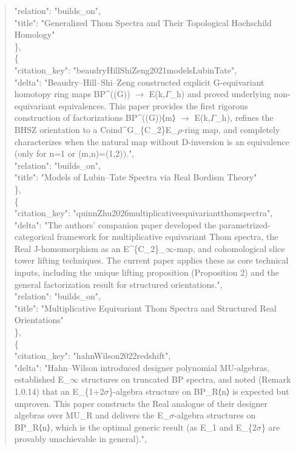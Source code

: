 \documentclass[11pt]{article}
\begin{document}
\begin{quote}
      "relation": "builds\_on",\\
      "title": "Generalized Thom Spectra and Their Topological Hochschild Homology"\\
    \},\\
    \{\\
      "citation\_key": "beaudryHillShiZeng2021modelsLubinTate",\\
      "delta": "Beaudry--Hill--Shi--Zeng constructed explicit G-equivariant homotopy ring maps BP\^{}((G)) \ensuremath{\to} E(k,\ensuremath{\Gamma}\_h) and proved underlying non-equivariant equivalences. This paper provides the first rigorous construction of factorizations BP\^{}((G))⟨m⟩ \ensuremath{\to} E(k,\ensuremath{\Gamma}\_h), refines the BHSZ orientation to a Coind\^{}G\_\{C\_2\}E\_\ensuremath{\rho}-ring map, and completely characterizes when the natural map without D-inversion is an equivalence (only for n=1 or (m,n)=(1,2)).",\\
      "relation": "builds\_on",\\
      "title": "Models of Lubin--Tate Spectra via Real Bordism Theory"\\
    \},\\
    \{\\
      "citation\_key": "quinnZhu2026multiplicativeequivariantthomspectra",\\
      "delta": "The authors' companion paper developed the parametrized-categorical framework for multiplicative equivariant Thom spectra, the Real J-homomorphism as an E\^{}\{C\_2\}\_\ensuremath{\infty}-map, and cohomological slice tower lifting techniques. The current paper applies these as core technical inputs, including the unique lifting proposition (Proposition 2) and the general factorization result for structured orientations.",\\
      "relation": "builds\_on",\\
      "title": "Multiplicative Equivariant Thom Spectra and Structured Real Orientations"\\
    \},\\
    \{\\
      "citation\_key": "hahnWilson2022redshift",\\
      "delta": "Hahn--Wilson introduced designer polynomial MU-algebras, established E\_\ensuremath{\infty} structures on truncated BP spectra, and noted (Remark 1.0.14) that an E\_\{1+2\ensuremath{\sigma}\}-algebra structure on BP\_R⟨n⟩ is expected but unproven. This paper constructs the Real analogue of their designer algebras over MU\_R and delivers the E\_\ensuremath{\sigma}-algebra structures on BP\_R⟨n⟩, which is the optimal generic result (as E\_1 and E\_\{2\ensuremath{\sigma}\} are provably unachievable in general).",\\

\end{quote}
\end{document}
